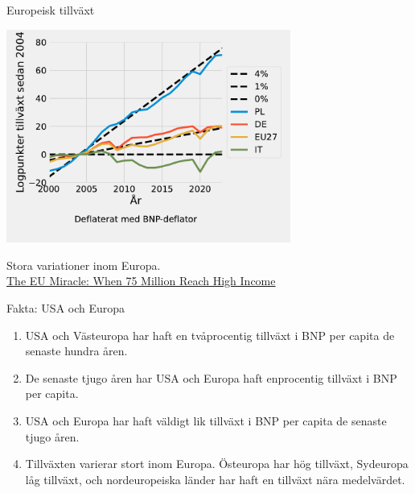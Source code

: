 \documentclass{beamer}
\begin{document}
\begin{frame}{Europeisk tillväxt}
    \label{eu_growth}
    \begin{center}
        \includegraphics[width=0.7\textwidth]{figures/GDP_growth0_Europe.pdf}
    \end{center}
    \bigskip

    {\footnotesize Stora variationer inom Europa. \\ \color{blue}\href{https://cepr.org/voxeu/columns/eu-miracle-when-75-million-reached-high-income}{The EU Miracle: When 75 Million Reach High Income}} \\
    \hyperlink{communist}{}
    \hyperlink{pigs}{}
\end{frame}

\begin{frame}{Fakta: USA och Europa}
    \begin{enumerate}
        \item USA och Västeuropa har haft en tvåprocentig tillväxt i BNP per capita de senaste hundra åren.
        \item De senaste tjugo åren har USA och Europa haft enprocentig tillväxt i BNP per capita.
        \item USA och Europa har haft väldigt lik tillväxt i BNP per capita de senaste tjugo åren.
        \item Tillväxten varierar stort inom Europa. Östeuropa har hög tillväxt, Sydeuropa låg tillväxt, och nordeuropeiska länder har haft en tillväxt nära medelvärdet.
    \end{enumerate}
\end{frame}
\end{document}
